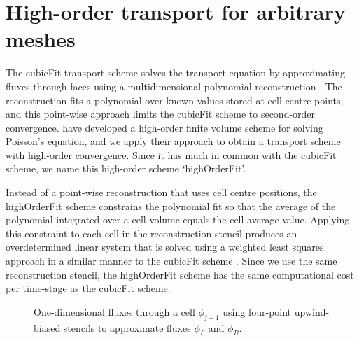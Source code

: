 \documentclass[a4paper,11pt]{article}
\begin{document}

\section{High-order transport for arbitrary meshes}

The cubicFit transport scheme solves the transport equation by approximating fluxes through faces using a multidimensional polynomial reconstruction \citep{shaw2017}.
The reconstruction fits a polynomial over known values stored at cell centre points, and this point-wise approach limits the cubicFit scheme to second-order convergence.
\citet{devendran2017} have developed a high-order finite volume scheme for solving Poisson's equation, and we apply their approach to obtain a transport scheme with high-order convergence.
Since it has much in common with the cubicFit scheme, we name this high-order scheme `highOrderFit'. 

Instead of a point-wise reconstruction that uses cell centre positions, the highOrderFit scheme constrains the polynomial fit so that the average of the polynomial integrated over a cell volume equals the cell average value.
Applying this constraint to each cell in the reconstruction stencil produces an overdetermined linear system that is solved using a weighted least squares approach in a similar manner to the cubicFit scheme \citep{shaw2017}.
Since we use the same reconstruction stencil, the highOrderFit scheme has the same computational cost per time-stage as the cubicFit scheme.

\begin{figure}
	\centering
	\caption{One-dimensional fluxes through a cell $\phi_{j+1}$ using four-point upwind-biased stencils to approximate fluxes $\phi_L$ and $\phi_R$.}
	\label{fig:1d-stencil}
\end{figure}
\end{document}
